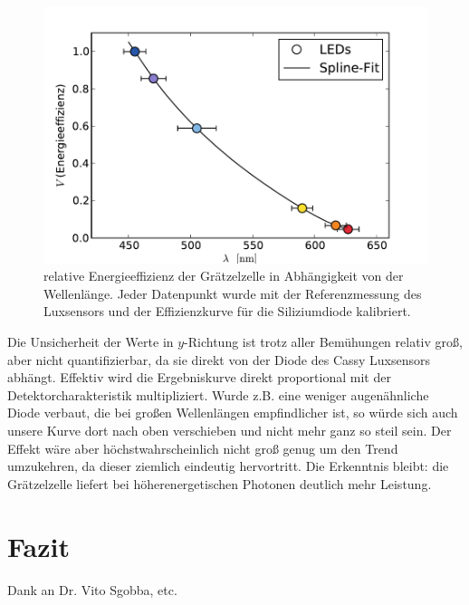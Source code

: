 \documentclass[11pt]{scrartcl}
\begin{document}
\begin{figure}[ht]
\begin{center}
\includegraphics[width=1.0\textwidth]{images/graetzel_lambda_korrigiert.pdf}
\end{center}
\vspace{-1.5\baselineskip}
\caption{relative Energieeffizienz der Grätzelzelle in Abhängigkeit von der Wellenlänge. Jeder Datenpunkt wurde mit der Referenzmessung des Luxsensors und der Effizienzkurve für die Siliziumdiode kalibriert.}
\label{lambda_korrigiert}
\end{figure}

Die Unsicherheit der Werte in $y$-Richtung ist trotz aller Bemühungen relativ groß, aber nicht quantifizierbar, da sie direkt von der Diode des Cassy Luxsensors abhängt. Effektiv wird die Ergebniskurve direkt proportional mit der Detektorcharakteristik multipliziert. Wurde z.B. eine weniger augenähnliche Diode verbaut, die bei großen Wellenlängen empfindlicher ist, so würde sich auch unsere Kurve dort nach oben verschieben und nicht mehr ganz so steil sein. Der Effekt wäre aber höchstwahrscheinlich nicht groß genug um den Trend umzukehren, da dieser ziemlich eindeutig hervortritt. Die Erkenntnis bleibt: die Grätzelzelle liefert bei höherenergetischen Photonen deutlich mehr Leistung.


\section{Fazit}
Dank an Dr. Vito Sgobba, etc.
\end{document}
